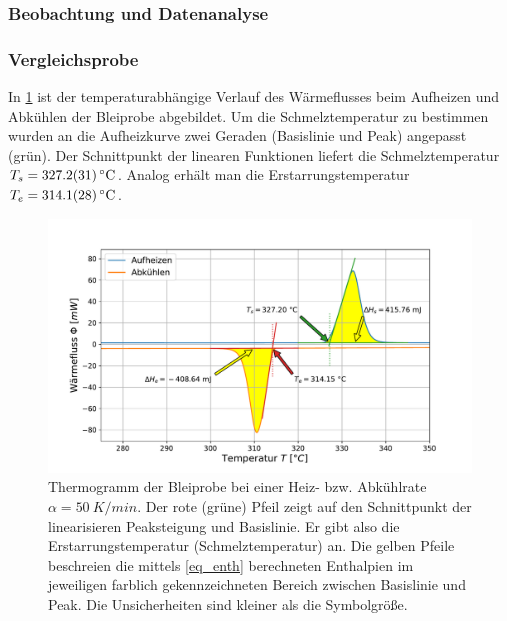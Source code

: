 \documentclass[
	a4paper,
	12pt,
	pagesize,
	ngerman
]{scrartcl}
\begin{document}
	\subsubsection{Beobachtung und Datenanalyse}
	\subsubsection*{Vergleichsprobe} \label{ssss_vergleich}
	In \cref{fig_thermo_blei} ist der temperaturabhängige Verlauf des Wärmeflusses beim Aufheizen und Abkühlen  der Bleiprobe abgebildet.
	Um die Schmelztemperatur zu bestimmen wurden an die Aufheizkurve zwei Geraden (Basislinie und Peak) angepasst (grün).
	Der Schnittpunkt der linearen Funktionen liefert die Schmelztemperatur $T_s= \SI{327.2+-3.1}{\celsius}$.
	Analog erhält man die Erstarrungstemperatur $T_e = \SI{314.1+-2.8}{\celsius}$.


	\begin{figure}[H]
			\includegraphics[width=\linewidth]{img/Kalorimetrie_blei.pdf}
			\caption{
			Thermogramm der Bleiprobe bei einer Heiz- bzw. Abkühlrate $\alpha =\SI{50}{K/min}$.
			Der rote (grüne) Pfeil zeigt auf den Schnittpunkt der linearisieren Peaksteigung und Basislinie.
			Er gibt also die Erstarrungstemperatur (Schmelztemperatur) an.
			Die gelben Pfeile beschreien die mittels \cref{eq_enth} berechneten Enthalpien im jeweiligen farblich gekennzeichneten Bereich zwischen Basislinie und Peak.
			Die Unsicherheiten sind kleiner als die Symbolgröße.
			}
			\label{fig_thermo_blei}
	\end{figure}
\end{document}
